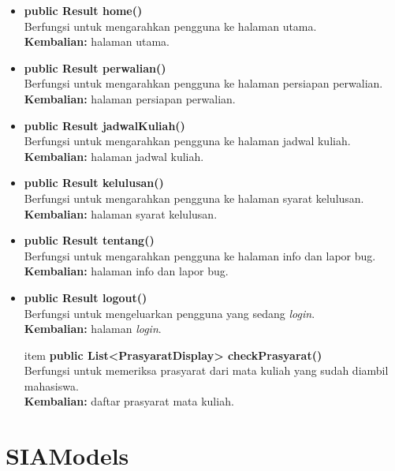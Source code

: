 \begin{enumerate}
\begin{enumerate}
\begin{itemize}
				\item \textbf{public Result home()}\\
				Berfungsi untuk mengarahkan pengguna ke halaman utama.\\
				\textbf{Kembalian:} halaman utama.
				
				\item \textbf{public Result perwalian()}\\
				Berfungsi untuk mengarahkan pengguna ke halaman persiapan perwalian.\\
				\textbf{Kembalian:} halaman persiapan perwalian.
				
				\item \textbf{public Result jadwalKuliah()}\\
				Berfungsi untuk mengarahkan pengguna ke halaman jadwal kuliah.\\
				\textbf{Kembalian:} halaman jadwal kuliah.
				
				\item \textbf{public Result kelulusan()}\\
				Berfungsi untuk mengarahkan pengguna ke halaman syarat kelulusan.\\
				\textbf{Kembalian:} halaman syarat kelulusan.
				
				\item \textbf{public Result tentang()}\\
				Berfungsi untuk mengarahkan pengguna ke halaman info dan lapor bug.\\
				\textbf{Kembalian:} halaman info dan lapor bug.
				
				\item \textbf{public Result logout()}\\
				Berfungsi untuk mengeluarkan pengguna yang sedang \textit{login}.\\
				\textbf{Kembalian:} halaman \textit{login}.
				
				item \textbf{public List<PrasyaratDisplay> checkPrasyarat()}\\
				Berfungsi untuk memeriksa prasyarat dari mata kuliah yang sudah diambil mahasiswa.\\
				\textbf{Kembalian:} daftar prasyarat mata kuliah.
		\end{itemize}
	\end{enumerate}
\end{enumerate}

\section{SIAModels}
\label{sec:siamodels}

